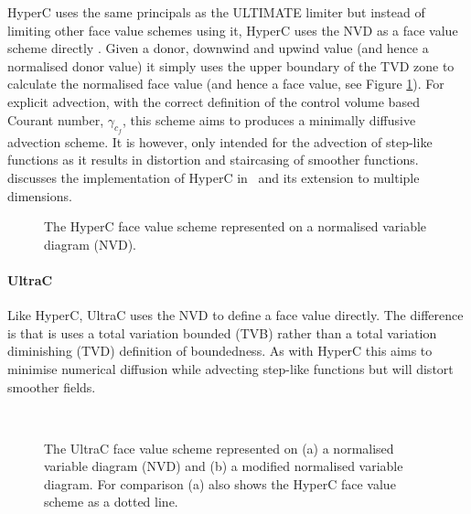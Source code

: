 HyperC uses the same principals as the ULTIMATE limiter but instead of limiting other face value schemes using it, HyperC uses the NVD as a face value scheme directly \citep{leonard_ultimate_1991}.  Given a donor, downwind and upwind value (and hence a normalised donor value) it simply uses the upper boundary of the TVD zone to calculate the normalised face value (and hence a face value, see Figure \ref{fig:hyperc}).  For explicit advection, with the correct definition of the control volume based Courant number,  $\gamma_{c_f}$, this scheme aims to produces a minimally diffusive advection scheme.  It is however, only intended for the advection of step-like functions as it results in distortion and staircasing of smoother functions. \citet{wilson_phdthesis_2009} discusses the implementation of HyperC in \fluidity\ and its extension to multiple dimensions.

\begin{figure}[tbp]
\begin{center}
\caption{The HyperC face value scheme represented on a normalised variable diagram (NVD).}
\label{fig:hyperc}
\end{center}
\end{figure}

\paragraph{UltraC} \label{sec:ultrac}

Like HyperC, UltraC uses the NVD to define a face value directly.  The difference is that is uses a total variation bounded (TVB) rather than a total variation diminishing (TVD) definition of boundedness.  As with HyperC this aims to minimise numerical diffusion while advecting step-like functions but will distort smoother fields.

\begin{figure}[tbp]
\begin{center}
 \\ \vspace{0.5cm}
\caption{The UltraC face value scheme represented on (a) a normalised variable diagram (NVD) and (b) a modified normalised variable diagram.  For comparison (a) also shows the HyperC face value scheme as a dotted line.}
\label{fig:ultrac}
\end{center}
\end{figure}

